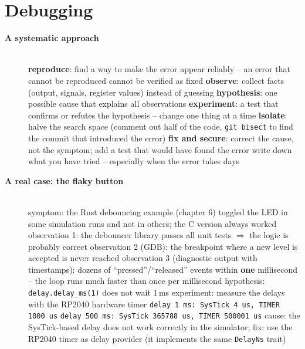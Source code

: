 \section{Debugging}

\begin{description}
\item[{\rot\bf A systematic approach}]~\\[-\lblskip]
\bi
	\ite \textbf{reproduce}: find a way to make the error appear reliably -- an error that cannot be reproduced cannot be verified as fixed
	\ite \textbf{observe}: collect facts (output, signals, register values) instead of guessing
	\ite \textbf{hypothesis}: one possible cause that explains all observations
	\ite \textbf{experiment}: a test that confirms or refutes the hypothesis -- change one thing at a time
	\ite \textbf{isolate}: halve the search space (comment out half of the code, \texttt{git bisect} to find the commit that introduced the error)
	\ite \textbf{fix and secure}: correct the cause, not the symptom; add a test that would have found the error
	\ite write down what you have tried -- especially when the error takes days
\ei
\os{\newpage}

\item[{\rot\bf A real case: the flaky button}]~\\[-\lblskip]
\bi
	\ite symptom: the Rust debouncing example (chapter 6) toggled the LED in some simulation runs and not in others; the C version always worked
	\ite observation 1: the debouncer library passes all unit tests $\Rightarrow$ the logic is probably correct
	\ite observation 2 (GDB): the breakpoint where a new level is accepted is never reached
	\ite observation 3 (diagnostic output with timestamps): dozens of ``pressed''/``released'' events within \textbf{one} millisecond -- the loop runs much faster than once per millisecond
	\ite hypothesis: \texttt{delay.delay\_ms(1)} does not wait 1\,ms
	\ite experiment: measure the delays with the RP2040 hardware timer
	\bi
		\ite \texttt{delay 1 ms: SysTick 4 us, TIMER 1000 us}
		\ite \texttt{delay 500 ms: SysTick 365788 us, TIMER 500001 us}
	\ei
	\ite cause: the SysTick-based delay does not work correctly in the simulator; fix: use the RP2040 timer as delay provider (it implements the same \texttt{DelayNs} trait)
\ei
\os{\newpage}


\end{description}
